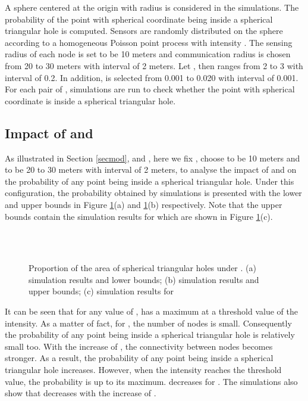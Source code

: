 \documentclass[journal, twoside]{IEEEtran}
\begin{document}
A sphere centered at the origin with radius  is considered in the simulations.
The probability of the point with spherical coordinate  being inside a spherical triangular hole
is computed. Sensors are randomly distributed on the sphere 
according to a homogeneous Poisson point process with intensity . The sensing
radius  of each node is set to be 10 meters and communication radius 
is chosen from 20 to 30 meters with interval of 2 meters. Let , then
 ranges from 2 to 3 with interval of 0.2. In addition,  is
selected from 0.001 to 0.020 with interval of 0.001. For each pair of ,
 simulations are run to check whether the
point with spherical coordinate  is inside a spherical triangular hole.

\subsection{Impact of  and }

As illustrated in Section \ref{secmod},  and , here we fix
, choose  to be 10 meters and  to be 20 to 30 meters with interval of 2 meters, to analyse the impact of  and  on the probability of any point being inside a spherical
triangular hole. Under this configuration, the probability  obtained by simulations is presented with the lower
and upper bounds in Figure \ref{figbound}(a) and \ref{figbound}(b) respectively. 
Note that the upper bounds contain the simulation results for 
which are shown in Figure \ref{figbound}(c).

\begin{figure}[ht]
  \centering {}
  \\
  \\
  \caption{Proportion of the area of spherical triangular holes under . (a) simulation results and
    lower bounds; (b) simulation results and upper bounds; (c) simulation results for }
  \label{figbound}
\end{figure}


It can be seen that for any value of ,  has a maximum at a threshold value 
 of the intensity. As a matter of fact, for , 
the number of nodes is small. Consequently the probability of any point being inside 
a spherical triangular hole is relatively small too. With the increase of , the 
connectivity between nodes becomes stronger. As a result, the probability of any point being 
inside a spherical triangular hole increases. However, when the intensity reaches 
the threshold value, the probability is up to its maximum.   
decreases for . The simulations also show  that  
decreases with the increase of . 
\end{document}
